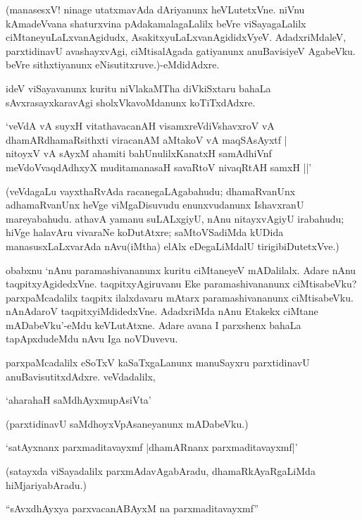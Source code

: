 (manasesxV! ninage utatxmavAda dAriyanunx heVLutetxVne. niVnu kAmadeVvana shaturxvina pAdakamalagaLalilx beVre viSayagaLalilx ciMtaneyuLaLxvanAgidudx, AsakitxyuLaLxvanAgididxVyeV. AdadxriMdaleV, parxtidinavU avashayxvAgi, ciMtisalAgada gatiyanunx anuBavisiyeV AgabeVku. beVre sithxtiyanunx eNisutitxruve.)-eMdidAdxre.

ideV viSayavanunx kuritu niVlakaMTha diVkiSxtaru bahaLa sAvxrasayxkaravAgi sholxVkavoMdanunx koTiTxdAdxre.

\begin{shloka}
`veVdA vA suyxH vitathavacanAH visamxreVdiVshavxroV vA\\
dhamARdhamaRsithxti viracanAM aMtakoV vA maqSAsAyxtf |\\
nitoyxV vA sAyxM ahamiti bahUnulilxKanatxH samAdhiVnf\\
meVdoVvaqdAdhxyX muditamanasaH savaRtoV nivaqRtAH samxH ||'
\end{shloka}

(veVdagaLu vayxthaRvAda racanegaLAgabahudu; dhamaRvanUnx adhamaRvanUnx heVge viMgaDisuvudu enunxvudanunx IshavxranU mareyabahudu. athavA yamanu suLALxgiyU, nAnu nitayxvAgiyU irabahudu; hiVge halavAru vivaraNe koDutAtxre; saMtoVSadiMda kUDida manasusxLaLxvarAda nAvu(iMtha) elAlx eDegaLiMdalU tirigibiDutetxVve.)

obabxnu `nAnu paramashivananunx kuritu ciMtaneyeV mADalilalx. Adare nAnu taqpitxyAgidedxVne. taqpitxyAgiruvanu Eke paramashivananunx ciMtisabeVku? parxpaMcadalilx taqpitx ilalxdavaru mAtarx paramashivananunx ciMtisabeVku. nAnAdaroV taqpitxyiMdidedxVne. AdadxriMda nAnu Etakekx ciMtane mADabeVku'-eMdu keVLutAtxne. Adare avana I parxshenx bahaLa tapApxdudeMdu nAvu Iga noVDuvevu.

parxpaMcadalilx eSoTxV kaSaTxgaLanunx manuSayxru parxtidinavU anuBavisutitxdAdxre. veVdadalilx,

\begin{shloka}
`aharahaH saMdhAyxmupAsiVta'
\end{shloka}

(parxtidinavU saMdhoyxVpAsaneyanunx mADabeVku.)

\begin{shloka}
`satAyxnanx parxmaditavayxmf |dhamARnanx parxmaditavayxmf|'
\end{shloka}

(satayxda viSayadalilx parxmAdavAgabAradu, dhamaRkAyaRgaLiMda hiMjariyabAradu.)

\begin{shloka}
``sAvxdhAyxya parxvacanABAyxM na parxmaditavayxmf''
\end{shloka}


